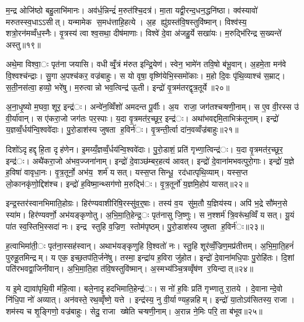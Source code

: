 म॒न्द्र ओजि॑ष्ठो बहु॒लाभि॑मानः। अव॑र्ध॒न्निन्द्रं॑ म॒रुत॑श्चि॒दत्र॑। मा॒ता यद्वी॒रन्द॒धन॒द्धनि॑ष्ठा। क्व॑स्यावो॑ मरुतस्स्व॒धाऽऽसीत्। यन्मामेक स॒मध॑त्ताहि॒हत्ये। अ॒ह ह्यु॑ग्रस्त॑वि॒षस्तुवि॑ष्मान्। विश्व॑स्य॒ शत्रो॒रन॑मव्वँध॒स्नैः। वृ॒त्रस्य॑ त्वा श्व॒सथा॒ दीष॑माणाः। विश्वे॑ दे॒वा अ॑जहु॒र्ये सखा॑यः। म॒रुद्भि॑रिन्द्र स॒ख्यन्ते॑ अस्तु॥१९॥

अथे॒मा विश्वा॒ः पृत॑ना जयासि। वधीव्वृँ॒त्रं म॑रुत इन्द्रि॒येण॑। स्वेन॒ भामे॑न तवि॒षो ब॑भू॒वान्। अ॒हमे॒ता मन॑वे वि॒श्वश्च॑न्द्राः। सु॒गा अ॒पश्च॑कर॒ वज्र॑बाहुः। स यो वृषा॒ वृष्णि॑येभि॒स्समो॑काः। म॒हो दि॒वः पृ॑थि॒व्याश्च॑ स॒म्राट्। स॒ती॒नस॑त्वा॒ हव्यो॒ भरे॑षु। म॒रुत्वान्नो भव॒त्विन्द्र॑ ऊ॒ती। इन्द्रो॑ वृ॒त्रम॑तरद्वृत्र॒तूर्ये॥२०॥

अ॒ना॒धृ॒ष्यो म॒घवा॒ शूर॒ इन्द्र॑ः। अन्वे॑न॒व्विँशो॑ अमदन्त पू॒र्वीः। अ॒य राजा॒ जग॑तश्चऱ्षणी॒नाम्। स ए॒व वी॒रस्स उ॑ वी॒र्या॑वान्। स ए॑करा॒जो जग॑तः पर॒स्पाः। य॒दा वृ॒त्रमत॑र॒च्छूर॒ इन्द्र॑ः। अथा॑भवद्दमि॒ताभिक्र॑तूनाम्। इन्द्रो॑ य॒ज्ञव्वँ॒र्धय॑न्वि॒श्ववे॑दाः। पु॒रो॒डाश॑स्य जुषता ह॒विर्न॑ः। वृ॒त्रन्ती॒र्त्वा दा॑न॒वव्वँज्र॑बाहुः॥२१॥

दिशो॑ऽदृहद्दृहि॒ता दृह॑णेन। इ॒मय्यँ॒ज्ञव्वँ॒र्धय॑न्वि॒श्ववे॑दाः। पु॒रो॒डाशं॒ प्रति॑ गृभ्णा॒त्विन्द्र॑ः। य॒दा वृ॒त्रमत॑र॒च्छूर॒ इन्द्र॑ः। अथै॑करा॒जो अ॑भव॒ज्जना॑नाम्। इन्द्रो॑ दे॒वाञ्छ॑म्बर॒हत्य॑ आवत्। इन्द्रो॑ दे॒वाना॑मभवत्पुरो॒गाः। इन्द्रो॑ य॒ज्ञे ह॒विषा॑ वावृधा॒नः। वृ॒त्र॒तूर्नो॒ अभ॑य॒ शर्म॑ यसत्। यस्स॒प्त सिन्धू॒ रद॑धात्पृथि॒व्याम्। यस्स॒प्त लो॒कानकृ॑णो॒द्दिश॑श्च। इन्द्रो॑ ह॒विष्मा॒न्थ्सग॑णो म॒रुद्भि॑ः। वृ॒त्र॒तूर्नो॑ य॒ज्ञमि॒होप॑ यासत्॥२२॥


इन्द्र॒स्तर॑स्वानभिमाति॒होग्रः। हिर॑ण्यवाशीरिषि॒रस्सु॑व॒र्॒षाः। तस्य॑ व॒य सु॑म॒तौ य॒ज्ञिय॑स्य। अपि॑ भ॒द्रे सौ॑मन॒से स्या॑म। हिर॑ण्यवर्णो॒ अभ॑यङ्कृणोतु। अ॒भि॒मा॒ति॒हेन्द्र॒ः पृत॑नासु जि॒ष्णुः। स न॒श्शर्म॑ त्रि॒वरू॑थ॒व्विँ यसत्। यू॒यं पा॑त स्व॒स्तिभि॒स्सदा॑ नः। इन्द्र स्तुहि व॒ज्रिण॒ स्तोम॑पृष्ठम्। पु॒रो॒डाश॑स्य जुषता ह॒विर्न॑ः॥२३॥

ह॒त्वाभिमा॑ती॒ः पृत॑ना॒स्सह॑स्वान्। अथाभ॑यङ्कृणुहि वि॒श्वतो॑ नः। स्तु॒हि शूर॑व्वँ॒ज्रिण॒मप्र॑तीत्तम्। अ॒भि॒मा॒ति॒हनं॑ पुरुहू॒तमिन्द्रम्। य एक॒ इच्छ॒तप॑ति॒र्जने॑षु। तस्मा॒ इन्द्रा॑य ह॒विरा जु॑होत। इन्द्रो॑ दे॒वाना॑मधि॒पाः पु॒रोहि॑तः। दि॒शां पति॑रभवद्वा॒जिनी॑वान्। अ॒भि॒मा॒ति॒हा त॑वि॒षस्तुवि॑ष्मान्। अ॒स्मभ्य॑ञ्चि॒त्रव्वृँष॑ण र॒यिन्दात्॥२४॥

य इ॒मे द्यावा॑पृथि॒वी म॑हि॒त्वा। बले॒नादृहदभिमाति॒हेन्द्र॑ः। स नो॑ ह॒विः प्रति॑ गृभ्णातु रा॒तये। दे॒वानान्दे॒वो नि॑धि॒पा नो॑ अव्यात्। अन॑वस्ते॒ रथ॒व्वृँष्णे॒ यत्ते। इन्द्र॑स्य॒ नु वी॒र्याण्यह॒न्नहिम्। इन्द्रो॑ या॒तोऽव॑सितस्य॒ राजा। शम॑स्य च शृ॒ङ्गिणो॒ वज्र॑बाहुः। सेदु॒ राजा ख्षेति चऱ्षणी॒नाम्। अ॒रान्न ने॒मिः परि॒ ता ब॑भूव॥२५॥

